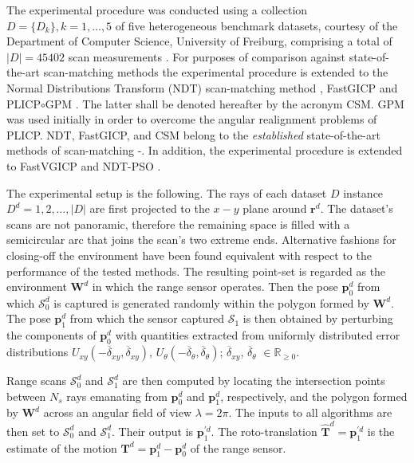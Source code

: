 The experimental procedure was conducted using a collection $D = \{D_k\}, k =
1,\dots,5$ of five heterogeneous benchmark datasets, courtesy of the Department
of Computer Science, University of Freiburg, comprising a total of $|D| =
45402$ scan measurements \cite{dataset_link}.  For purposes of comparison
against state-of-the-art scan-matching methods the experimental procedure is
extended to the Normal Distributions Transform (NDT) scan-matching method
\cite{ndt1}, FastGICP \cite{fgicp} and PLICP$\circ$GPM \cite{plicp}. The latter
shall be denoted hereafter by the acronym CSM. GPM was used initially in order
to overcome the angular realignment problems \cite{plicp} of PLICP. NDT,
FastGICP, and CSM belong to the \textit{established} state-of-the-art methods
of scan-matching \cite{vgicp}\cite{sota_leg_1}-\cite{sota_leg_5}. In addition,
the experimental procedure is extended to FastVGICP \cite{vgicp} and NDT-PSO
\cite{ndt_pso}.

The experimental setup is the following. The rays of each dataset $D$ instance
$D^d = 1,2,\dots,|D|$ are first projected to the $x-y$ plane around $\bm{r}^d$.
The dataset's scans are not panoramic, therefore the remaining space is filled
with a semicircular arc that joins the scan's two extreme ends. Alternative
fashions for closing-off the environment have been found equivalent with
respect to the performance of the tested methods. The resulting point-set is
regarded as the environment $\bm{W}^d$ in which the range sensor operates. Then
the pose $\bm{p}_0^d$ from which $\mathcal{S}_0^d$ is captured is generated
randomly within the polygon formed by $\bm{W}^d$. The pose $\bm{p}_1^d$ from
which the sensor captured $\mathcal{S}_1$ is then obtained by perturbing the
components of $\bm{p}_0^d$ with quantities extracted from uniformly distributed
error distributions $U_{xy}(-\overline{\delta}_{xy}, \overline{\delta}_{xy})$,
$U_{\theta}(-\overline{\delta}_{\theta}, \overline{\delta}_{\theta})$;
$\overline{\delta}_{xy}$, $\overline{\delta}_\theta$ $\in \mathbb{R}_{\geq 0}$.

Range scans $\mathcal{S}_0^d$ and $\mathcal{S}_1^d$ are then computed by
locating the intersection points between $N_s$ rays emanating from $\bm{p}_0^d$
and $\bm{p}_1^d$, respectively, and the polygon formed by $\bm{W}^d$ across an
angular field of view $\lambda = 2\pi$. The inputs to all algorithms are
then set to $\mathcal{S}_0^d$ and $\mathcal{S}_1^d$. Their output is
$\bm{p}_1^{\prime d}$. The roto-translation
$\hat{\bm{T}}^d = \bm{p}_1^{\prime d}$ is the estimate of the motion
$\bm{T}^d = \bm{p}_1^d - \bm{p}_0^d$ of the range sensor.

